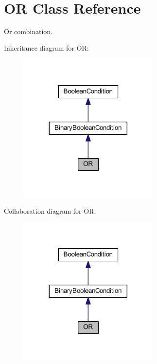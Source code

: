 \hypertarget{class_o_r}{\section{O\-R Class Reference}
\label{class_o_r}
}


Or combination.  




Inheritance diagram for O\-R\-:\nopagebreak
\begin{figure}[H]
\begin{center}
\leavevmode
\includegraphics[width=200pt]{class_o_r__inherit__graph}
\end{center}
\end{figure}


Collaboration diagram for O\-R\-:\nopagebreak
\begin{figure}[H]
\begin{center}
\leavevmode
\includegraphics[width=200pt]{class_o_r__coll__graph}
\end{center}
\end{figure}
